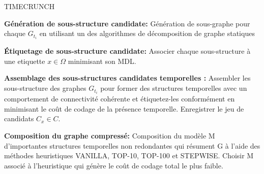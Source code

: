 			 \begin{algorithm}
					\caption{TIMECRUNCH}
				\begin{algorithmic} [1]
					\STATE \textbf{Génération de sous-structure candidate: }Génération de sous-graphe pour chaque $G_{t_{i}}$ en utilisant un des algorithmes de décomposition de graphe statiques
					
					
					\STATE  \textbf{Étiquetage de sous-structure candidate: }Associer chaque sous-structure à une etiquette $x \in \Omega$ minimisant son MDL.
					
					\STATE  \textbf{Assemblage des sous-structures candidates temporelles :} Assembler les sous-structure des graphes $G_{t_{i}}$ pour former des structures temporelles avec un comportement de connectivité cohérente et étiquetez-les conformément en minimisant le coût de codage de la présence temporelle. Enregistrer le jeu de candidats $C_{x} \in C $.
					
					\STATE \textbf{Composition du graphe compressé: }Composition du modèle M d'importantes structures temporelles non redondantes qui résument G à l'aide des méthodes heuristiques VANILLA, TOP-10, TOP-100 et STEPWISE. Choisir M associé à l'heuristique qui génère le coût de codage total le plus faible.
				\end{algorithmic}
			\end{algorithm}
			 
			 
			 
			 
			 
			 
			 
			 
			 
			 
			 
			 